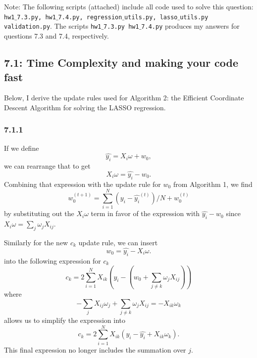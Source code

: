 \documentclass[12pt]{amsart}
\begin{document}
Note: The following scripts (attached) include all code used to solve this question: {\tt hw1$\_$7.3.py, hw1$\_$7.4.py, regression$\_$utils.py, lasso$\_$utils.py  validation.py}.  The scripts {\tt hw1$\_$7.3.py  hw1$\_$7.4.py} produces my answers for questions 7.3 and 7.4, respectively.  

\subsection*{7.1: Time Complexity and making your code fast}

Below, I derive the update rules used for Algorithm 2: the Efficient Coordinate Descent Algorithm for solving the LASSO regression.

\subsubsection*{7.1.1}
If we define
\begin{equation}
\hat{y_i} = X_i \omega + w_0,
\end{equation}
we can rearrange that to get 
\begin{equation}
X_i \omega = \hat{y_i} - w_0.
\end{equation}
Combining that expression with the update rule for $w_0$ from Algorithm 1, we find
\begin{equation}
w_0^{(t+1)} = \sum_{i = 1}^N (y_i - \hat{y_i}^{(t)})/N + w_0^{(t)}
\end{equation}
by substituting out the $X_i \omega$ term in favor of the expression with $\hat{y_i} - w_0$ since $X_i \omega = \sum_j \omega_j X_{ij}$.

Similarly for the new $c_k$ update rule, we can insert
\begin{equation}
w_0 = \hat{y_i} - X_i \omega.
\end{equation}
into the following expression for $c_k$
\begin{equation}
c_k = 2 \sum_{i=1}^N X_{ik}(y_i - (w_0 + \sum_{j \neq k}\omega_j X_{ij}))
\end{equation}
where 
\begin{equation}
-\sum_j X_{ij}\omega_j + \sum_{j \neq k}\omega_j X_{ij} = -X_{ik}\omega_k
\end{equation}
allows us to simplify the expression into 
\begin{equation}
c_k = 2 \sum_{i=1}^N X_{ik}(y_i - \hat{y_i} + X_{ik}\omega_k).
\end{equation}
This final expression no longer includes the summation over $j$.
\end{document}
